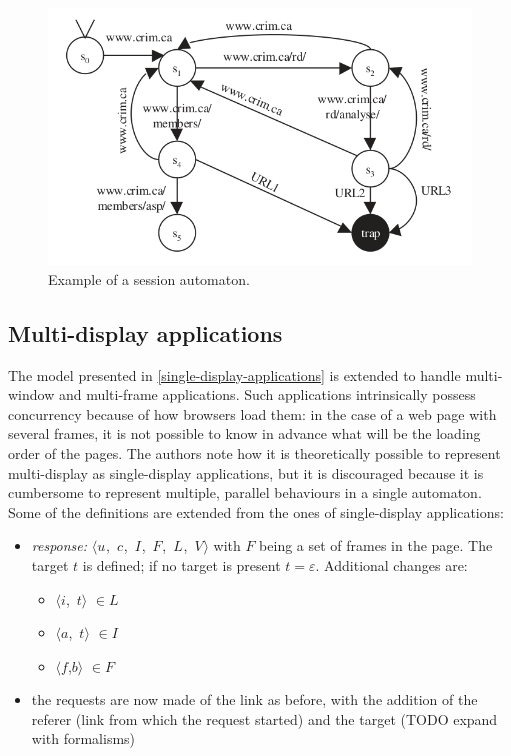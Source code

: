 \documentclass[a4paper,10pt]{article}
\newcommand{\tuple}[1]{\mbox{$\langle$#1$\rangle$}}
\newcommand{\resmulti}[1][]{
  \ifthenelse{\equal{#1}{}}{\mbox{$\langle u$, $c$, $I$, $F$, $L$, $V\rangle$}}
  {\mbox{$\langle u_{#1}$, $c_{#1}$, $I_{#1}$, $F_{#1}$, $L_{#1}$, $V_{#1}\rangle$}}
}
\theoremstyle{plain} %
\theoremstyle{definition}
\theoremstyle{remark}
\begin{document}
\begin{figure}[h]
  \includegraphics[width=\textwidth]{img/session_automaton_example.png}
  \caption{Example of a session automaton.}
  \label{fig:example-session-automaton}
\end{figure}

\subsection{Multi-display applications}

The model presented in \cref{single-display-applications} is extended to handle multi-window and multi-frame applications. Such applications intrinsically possess concurrency because of how browsers load them: in the case of a web page with several frames, it is not possible to know in advance what will be the loading order of the pages. The authors note how it is theoretically possible to represent multi-display as single-display applications, but it is discouraged because it is cumbersome to represent multiple, parallel behaviours in a single automaton. Some of the definitions are extended from the ones of single-display applications:

\begin{itemize}
  \item \textit{response:} \resmulti with $F$ being a set of frames in the page. The target $t$ is defined; if no target is present $t = \varepsilon$. Additional changes are:
    \begin{itemize}
      \item \tuple{$i$, $t$} $\in L$
      \item \tuple{$a$, $t$} $\in I$
      \item \tuple{$f$,$b$} $\in F$
    \end{itemize}
  \item the requests are now made of the link as before, with the addition of the referer (link from which the request started) and the target (TODO expand with formalisms)
\end{itemize}
\end{document}
